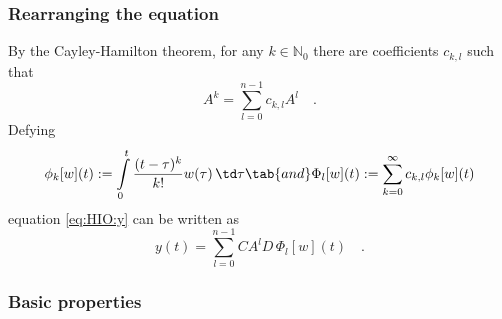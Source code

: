\subsubsection*{Rearranging the equation}
	By the Cayley-Hamilton theorem, for any $k\in\mathbb{N}_0$ there are coefficients 	
	$c_{k,l}$ 
	such that 
	\begin{equation}
	A^k = \sum\limits_{l=0}^{n-1} c_{k,l} A^l \quad .\label{eq:HIO:cayley-hamilton}
	\end{equation}
	Defying
	\begin{equation}
	\phi_k[w](t) := \int\limits_0^t \frac{(t-\tau)^k}{k!} w(\tau) \, \td \tau 
	\tab{and}
	\Phi_l[w](t) :=  \sum\limits_{k=0}^\infty c_{k,l} \phi_k[w](t)  \label{eq:HIO:Phi}
	\end{equation}
	equation \eqref{eq:HIO:y} can be written as
	\begin{equation}
	y(t) = \sum\limits_{l=0}^{n-1} CA^lD \, \Phi_l[w](t)
	\quad . \label{eq:HIO:y_operator}
	\end{equation}

\subsubsection*{Basic properties}


